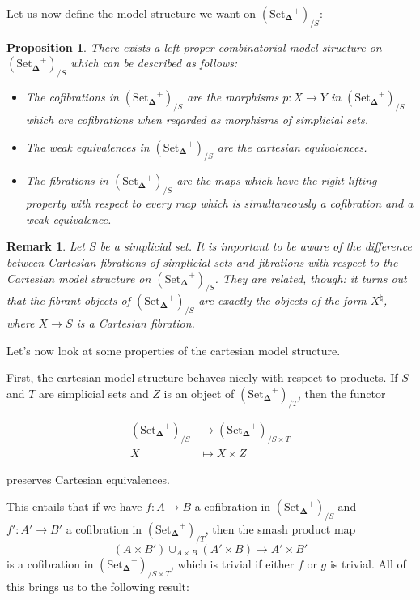 \documentclass[12pt]{amsart}
\newcommand{\8}{\ensuremath{\infty}}
\newcommand{\SSet}{\ensuremath{\text{Set}_{\boldsymbol{\Delta}}}}
\newtheorem{proposition}{Proposition}
\newtheorem{remark}{Remark}
\begin{document}
Let us now define the model structure we want on $(\SSet^+)_{/S}$:
\begin{proposition}
  There exists a left proper combinatorial model structure on $(\SSet^+)_{/S}$ which can be described as follows:
  \begin{itemize}
    \item[(C)] The cofibrations in $(\SSet^+)_{/S}$ are the morphisms $p: X \rightarrow Y$ in $(\SSet^+)_{/S}$ which are cofibrations when regarded as morphisms of simplicial sets.
    \item[(W)] The weak equivalences in $(\SSet^+)_{/S}$ are the cartesian equivalences.
    \item[(F)] The fibrations in $(\SSet^+)_{/S}$ are the maps which have the right lifting property with respect to every map which is simultaneously a cofibration and a weak equivalence.
  \end{itemize}
\end{proposition}

\begin{remark}
  Let $S$ be a simplicial set. It is important to be aware of the difference between Cartesian fibrations of simplicial sets and fibrations with respect to the Cartesian model structure on $(\SSet^+)_{/S}$. They are related, though: it turns out that the fibrant objects of $(\SSet^+)_{/S}$ are exactly the objects of the form $X^\natural$, where $X \rightarrow S$ is a Cartesian fibration.
\end{remark}

Let's now look at some properties of the cartesian model structure.

First, the cartesian model structure behaves nicely with respect to products. If $S$ and $T$ are simplicial sets and $Z$ is an object of $(\SSet^+)_{/T}$, then the functor

\begin{align*}
  (\SSet^+)_{/S} & \rightarrow (\SSet^+)_{/S\times T} \\
  X              & \mapsto X\times Z
\end{align*}

preserves Cartesian equivalences.

This entails that if we have $f: A \rightarrow B$ a cofibration in $(\SSet^+)_{/S}$ and $f': A' \rightarrow B'$ a cofibration in $(\SSet^+)_{/T}$, then the smash product map
\[(A\times B')\displaystyle \cup_{A\times B}(A'\times B) \rightarrow A'\times B'\] is a cofibration in $(\SSet^+)_{/S\times T}$, which is trivial if either $f$ or $g$ is trivial. All of this brings us to the following result:
\end{document}
